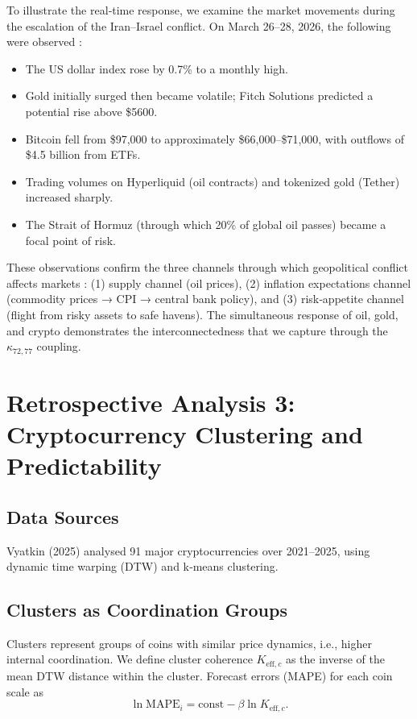 \documentclass[11pt,a4paper]{article}
\newcommand{\Keffc}{K_{\mathrm{eff},c}}
\theoremstyle{remark}
\begin{document}
	To illustrate the real‑time response, we examine the market movements during the escalation of the Iran–Israel conflict. On March 26–28, 2026, the following were observed \cite{LIGA2026, DLNews2026, PANews2026, Cointelegraph2026}:
	\begin{itemize}
		\item The US dollar index rose by 0.7\% to a monthly high.
		\item Gold initially surged then became volatile; Fitch Solutions predicted a potential rise above \$5600.
		\item Bitcoin fell from \$97,000 to approximately \$66,000–\$71,000, with outflows of \$4.5 billion from ETFs.
		\item Trading volumes on Hyperliquid (oil contracts) and tokenized gold (Tether) increased sharply.
		\item The Strait of Hormuz (through which 20\% of global oil passes) became a focal point of risk.
	\end{itemize}
	
	These observations confirm the three channels through which geopolitical conflict affects markets \cite{PANews2026}: (1) supply channel (oil prices), (2) inflation expectations channel (commodity prices → CPI → central bank policy), and (3) risk‑appetite channel (flight from risky assets to safe havens). The simultaneous response of oil, gold, and crypto demonstrates the interconnectedness that we capture through the $\kappa_{72,77}$ coupling.
	
	\section{Retrospective Analysis 3: Cryptocurrency Clustering and Predictability}
	\label{sec:crypto}
	
	\subsection{Data Sources}
	Vyatkin (2025) \cite{Vyatkin2025} analysed 91 major cryptocurrencies over 2021–2025, using dynamic time warping (DTW) and k‑means clustering.
	
	\subsection{Clusters as Coordination Groups}
	
	Clusters represent groups of coins with similar price dynamics, i.e., higher internal coordination. We define cluster coherence $\Keffc$ as the inverse of the mean DTW distance within the cluster. Forecast errors (MAPE) for each coin scale as
	\begin{equation}
		\ln \text{MAPE}_i = \text{const} - \beta \ln \Keffc.
		\label{eq:crypto}
	\end{equation}
	
\end{document}
